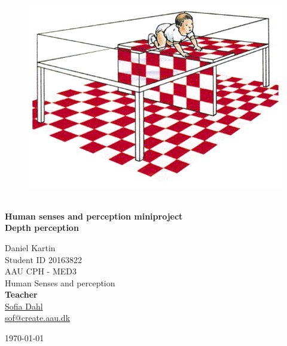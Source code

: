 \begin{titlepage}
			
\addtolength{\voffset}{2cm}

\begin{figure}[H]
\centering
\vspace{2cm}	%
\includegraphics[width=0.99\linewidth]{figure/Frontpage/frontpage.png}
\end{figure}

\mbox{}
\vfill
\renewcommand{\familydefault}{\sfdefault} \normalfont %
\HRule\\[0.2cm]
\textbf{{\small Human senses and perception miniproject\\ \Huge Depth perception}}\\
\HRule\medskip{}
\begin{multicols}{2}
{\Large Daniel Kartin\\Student ID 20163822\\\small AAU CPH - 
	MED3 \\
	Human Senses and perception\columnbreak}\\
\setlength{\parskip}{2.4cm}
\Large{\textbf{Teacher}\\\href{http://personprofil.aau.dk/118552?lang=en}{\color{blue}Sofia Dahl}\\ \href{mailto:sof@create.aau.dk}{sof@create.aau.dk}}
\end{multicols}
\today
\renewcommand{\familydefault}{\rmdefault} \normalfont %
\end{titlepage}



